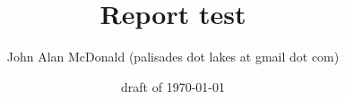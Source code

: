 \documentclass{PalisadesLakesReport}
\title{Report test}
\author{John Alan McDonald 
(palisades dot lakes at gmail dot com)}
\date{draft of \today}
\begin{document}
\maketitle
\PalisadesLakesTableOfContents

\end{document}
